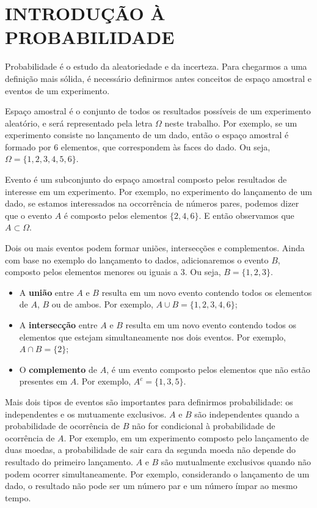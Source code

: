 \chapter{INTRODUÇÃO À PROBABILIDADE}

Probabilidade é o estudo da aleatoriedade e da incerteza. Para chegarmos a uma definição mais sólida, é necessário definirmos antes conceitos de espaço amostral e eventos de um experimento. 

Espaço amostral é o conjunto de todos os resultados possíveis de um experimento aleatório, e será representado pela letra $\Omega$ neste trabalho. Por exemplo, se um experimento consiste no lançamento de um dado, então o espaço amostral é formado por 6 elementos, que correspondem às faces do dado. Ou seja, $\Omega= \{1,2,3,4,5,6\}$. 

Evento é um subconjunto do espaço amostral composto pelos resultados de interesse em um experimento. Por exemplo, no experimento do lançamento de um dado, se estamos interessados na occorrência de números pares, podemos dizer que o evento $A$ é composto pelos elementos $\{2,4,6\}$. E então observamos que $A \subset \Omega$.

Dois ou mais eventos podem formar uniões, intersecções e complementos. Ainda com base no exemplo do lançamento to dados, adicionaremos o evento $B$, composto pelos elementos menores ou iguais a 3. Ou seja, $B = \{1,2,3 \}$.

\begin{itemize}
    \item A \textbf{união} entre $A$ e $B$ resulta em um novo evento contendo todos os elementos de $A$, $B$ ou de ambos. Por exemplo, $A \cup B = \{1,2,3,4,6\}$;
    \item A \textbf{intersecção} entre $A$ e $B$ resulta em um novo evento contendo todos os elementos que estejam simultaneamente nos dois eventos. Por exemplo, $A \cap B = \{ 2\}$;
    \item O \textbf{complemento} de $A$, é um evento composto pelos elementos que não estão presentes em $A$. Por exemplo, $A^c = \{1,3,5\}$.
\end{itemize}

Mais dois tipos de eventos são importantes para definirmos probabilidade: os independentes e os mutuamente exclusivos. $A$ e $B$ são independentes quando a probabilidade de ocorrência de $B$ não for condicional à probabilidade de ocorrência de $A$. Por exemplo, em um experimento composto pelo lançamento de duas moedas, a probabilidade de sair cara da segunda moeda não depende do resultado do primeiro lançamento. $A$ e $B$ são mutualmente exclusivos quando não podem ocorrer simultaneamente. Por exemplo, considerando o lançamento de um dado, o resultado não pode ser um número par e um número ímpar ao mesmo tempo.

